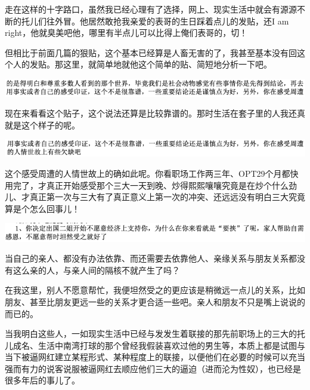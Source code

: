 \documentclass[9pt, b5paper]{article}
\begin{document}
走在这样的十字路口，虽然我已经心理有了选择，网上、现实生活中就会有源源不断的托儿们往外冒。他居然敢抢我亲爱的表哥的生日踩着点儿的发贴，还I am right，他就臭美吧他，哪里有半点儿可以比得上俺们表哥的，切！

但相比于前面几篇的狠贴，这个基本已经算是人畜无害的了，我甚至基本没有回这个人的发贴。那这里，就简单地就他这个简单的贴、简短地分析一下吧。 

\begin{center}
\includegraphics[width=.9\linewidth]{./pic/backups_plans_20210413_183142.png}
\end{center}

现在来看看这个贴子，这个说法还算是比较靠谱的。那时生活在套子里的人我还真就是这个样子的呢。

\begin{center}
\includegraphics[width=.9\linewidth]{./pic/backups_plans_20210413_183656.png}
\end{center}

这个感受周遭的人情世故上的确如此呢。你看职场工作两三年、OPT29个月都快用完了，才真正开始感受那个三大一天到晚、炒得熙熙嚷嚷究竟是在炒个什么劲儿、才真正第一次与三大有了真正意义上第一次的冲突、还远远没有明白三大究竟算是个怎么回事儿！

\begin{center}
\includegraphics[width=.9\linewidth]{./pic/backups_plans_20210413_183958.png}
\end{center}

当自己的亲人、都没有办法依靠、而还需要去依靠他人、亲缘关系与朋友关系都没有这么亲的人，与亲人间的隔核不就产生了吗？

在我这里，别人不愿意帮忙，我便坦然受之的更应该是稍微远一点儿的关系，比如朋友、甚至比朋友更远一些的关系才更合适一些吧。亲人和朋友不只是嘴上说说的而已的。 

当我明白这些人，一如现实生活中已经与发发生着联接的那先前职场上的三大的托儿成名、生活中南湾打球的那个曾经我假装喜欢过他的男生等，本质上都是试图与当下被逼网红建立某程形式、某种程度上的联接，以便他们在必要的时候可以充当强而有力的说客说服被逼网红去顺应他们三大的逼迫（进而沦为性奴），也已经是很多年后的事儿了。 
\end{document}
